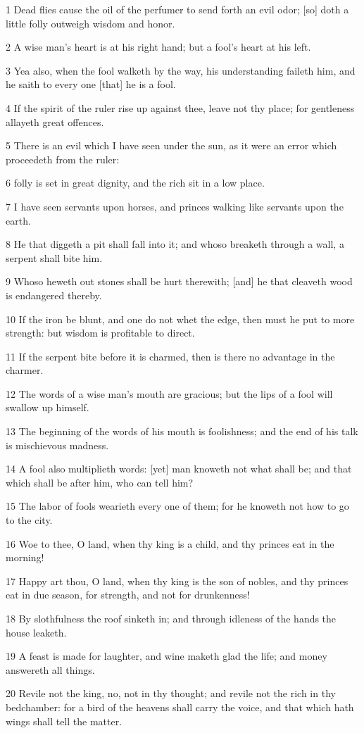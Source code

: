 \par 1 Dead flies cause the oil of the perfumer to send forth an evil odor; [so] doth a little folly outweigh wisdom and honor.
\par 2 A wise man's heart is at his right hand; but a fool's heart at his left.
\par 3 Yea also, when the fool walketh by the way, his understanding faileth him, and he saith to every one [that] he is a fool.
\par 4 If the spirit of the ruler rise up against thee, leave not thy place; for gentleness allayeth great offences.
\par 5 There is an evil which I have seen under the sun, as it were an error which proceedeth from the ruler:
\par 6 folly is set in great dignity, and the rich sit in a low place.
\par 7 I have seen servants upon horses, and princes walking like servants upon the earth.
\par 8 He that diggeth a pit shall fall into it; and whoso breaketh through a wall, a serpent shall bite him.
\par 9 Whoso heweth out stones shall be hurt therewith; [and] he that cleaveth wood is endangered thereby.
\par 10 If the iron be blunt, and one do not whet the edge, then must he put to more strength: but wisdom is profitable to direct.
\par 11 If the serpent bite before it is charmed, then is there no advantage in the charmer.
\par 12 The words of a wise man's mouth are gracious; but the lips of a fool will swallow up himself.
\par 13 The beginning of the words of his mouth is foolishness; and the end of his talk is mischievous madness.
\par 14 A fool also multiplieth words: [yet] man knoweth not what shall be; and that which shall be after him, who can tell him?
\par 15 The labor of fools wearieth every one of them; for he knoweth not how to go to the city.
\par 16 Woe to thee, O land, when thy king is a child, and thy princes eat in the morning!
\par 17 Happy art thou, O land, when thy king is the son of nobles, and thy princes eat in due season, for strength, and not for drunkenness!
\par 18 By slothfulness the roof sinketh in; and through idleness of the hands the house leaketh.
\par 19 A feast is made for laughter, and wine maketh glad the life; and money answereth all things.
\par 20 Revile not the king, no, not in thy thought; and revile not the rich in thy bedchamber: for a bird of the heavens shall carry the voice, and that which hath wings shall tell the matter.

